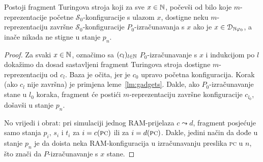 \begin{propozicija}[{name=[treći fragment transpiliranog stroja]}]\label{pp:faza3}
	Postoji fragment Turingova stroja koji za sve $x\in{\mathbb N}$, počevši od bilo koje $m$-reprezentacije početne $\mathcal S_0$-konfiguracije s ulazom $x$, dostigne neku $m$-reprezentaciju završne $\mathcal S_0$-konfiguracije $P_0$-izračunavanja s $x$ ako je $x\in\mathcal D_{{\mathbb N}\varphi_0}$, a inače nikada ne stigne u stanje $p_n$.
\end{propozicija}
\begin{proof}
	Za svaki $x\in{\mathbb N}$, označimo sa $(c_l)_{l\in{\mathbb N}}$ $P_0$-izračunavanje s $x$ i indukcijom po $l$ dokažimo da dosad sastavljeni fragment Turingova stroja dostigne $m$-reprezentaciju od $c_l$. Baza je očita, jer je $c_0$ upravo početna konfiguracija. %
	Korak (ako $c_l$ nije završna) je primjena leme~\ref{lm:gadgets}. Dakle, ako $P_0$-izračunavanje stane u $l_0$ koraka, fragment će postići $m$-reprezentaciju završne konfiguracije $c_{l_0}$, došavši u stanje $p_n$.

No vrijedi i obrat: pri simulaciji jednog RAM-prijelaza $c\leadsto d$, fragment posjećuje samo stanja $p_i$, $s_i$ i $t_i$ za $i=c(\textsc{pc})$ ili za $i=d(\textsc{pc})$. Dakle, jedini način da dođe u stanje $p_n$ je da doista neka RAM-konfiguracija u izračunavanju preslika \textsc{pc} u $n$, što znači da $P$-izračunavanje s $x$ stane.
\end{proof}



